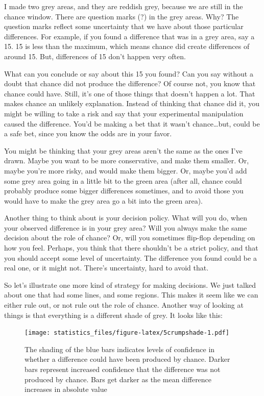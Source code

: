 \documentclass[]{book}
\begin{document}
I made two grey areas, and they are reddish grey, because we are still in the chance window. There are question marks (?) in the grey areas. Why? The question marks reflect some uncertainty that we have about those particular differences. For example, if you found a difference that was in a grey area, say a 15. 15 is less than the maximum, which means chance did create differences of around 15. But, differences of 15 don't happen very often.

What can you conclude or say about this 15 you found? Can you say without a doubt that chance did not produce the difference? Of course not, you know that chance could have. Still, it's one of those things that doesn't happen a lot. That makes chance an unlikely explanation. Instead of thinking that chance did it, you might be willing to take a risk and say that your experimental manipulation caused the difference. You'd be making a bet that it wasn't chance\ldots{}but, could be a safe bet, since you know the odds are in your favor.

You might be thinking that your grey areas aren't the same as the ones I've drawn. Maybe you want to be more conservative, and make them smaller. Or, maybe you're more risky, and would make them bigger. Or, maybe you'd add some grey area going in a little bit to the green area (after all, chance could probably produce some bigger differences sometimes, and to avoid those you would have to make the grey area go a bit into the green area).

Another thing to think about is your decision policy. What will you do, when your observed difference is in your grey area? Will you always make the same decision about the role of chance? Or, will you sometimes flip-flop depending on how you feel. Perhaps, you think that there shouldn't be a strict policy, and that you should accept some level of uncertainty. The difference you found could be a real one, or it might not. There's uncertainty, hard to avoid that.

So let's illustrate one more kind of strategy for making decisions. We just talked about one that had some lines, and some regions. This makes it seem like we can either rule out, or not rule out the role of chance. Another way of looking at things is that everything is a different shade of grey. It looks like this:

\begin{figure}
\centering
\texttt{[image: statistics\_files/figure-latex/5crumpshade-1.pdf]}
\caption{\label{fig:5crumpshade}The shading of the blue bars indicates levels of confidence in whether a difference could have been produced by chance. Darker bars represent increased confidence that the difference was not produced by chance. Bars get darker as the mean difference increases in absolute value}
\end{figure}
\end{document}
